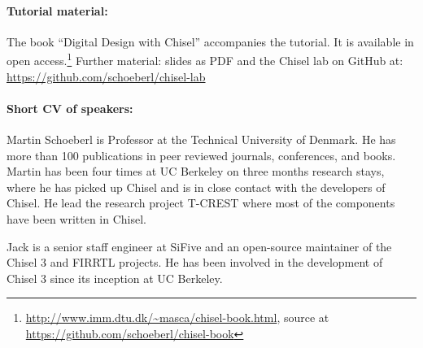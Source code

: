 \documentclass{article}
\begin{document}
 \paragraph{Tutorial material:}
The book ``Digital Design with Chisel'' accompanies the tutorial.
It is available in open access.\footnote{\url{http://www.imm.dtu.dk/~masca/chisel-book.html}, source at \url{https://github.com/schoeberl/chisel-book}}
Further material: slides as PDF and the Chisel lab on GitHub at: \url{https://github.com/schoeberl/chisel-lab}


\paragraph{Short CV of speakers:}
Martin Schoeberl is Professor at the Technical University of Denmark.
He has more than 100 publications in peer reviewed journals, conferences, and books.
Martin has been four times at UC Berkeley on three months research stays, where he has picked up Chisel
and is in close contact with the developers of Chisel.
He lead the research project T-CREST where most of the components have been written in Chisel.

Jack is a senior staff engineer at SiFive and an open-source maintainer of the Chisel 3
and FIRRTL projects. He has been involved in the development of Chisel 3 since its inception at UC Berkeley.
\end{document}
